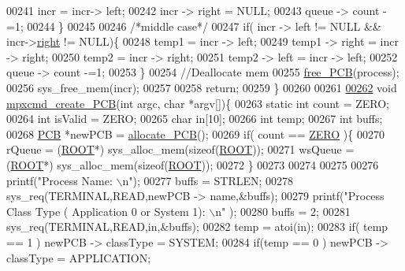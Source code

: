 \begin{DoxyCode}
00241                 incr = incr-> left;
00242                 incr -> right  = NULL;
00243                 queue -> count -=1;
00244         \}
00245         
00246         \textcolor{comment}{/*middle case*/}
00247         \textcolor{keywordflow}{if}( incr -> left != NULL && incr->\hyperlink{structpage_a59bb1b5eca2d579befcc93a2833f4dfd}{right} != NULL)\{
00248                 temp1 = incr -> left;
00249                 temp1 -> right = incr -> right;
00250                 temp2 = incr -> right;
00251                 temp2 -> left = incr -> left;
00252                 queue -> count -=1;
00253         \}
00254         \textcolor{comment}{//Deallocate mem}
00255         \hyperlink{mpx__r2_8c_a79890f055b1d0fccf1962bbde4877caa}{free_PCB}(process);
00256         sys\_free\_mem(incr);
00257         
00258         \textcolor{keywordflow}{return};
00259         \}
00260 
00261 
\hypertarget{mpx__r2_8c_source_l00262}{}\hyperlink{mpx__r2_8h_a782285c58822e411fb75be1e65fe1104}{00262} \textcolor{keywordtype}{void} \hyperlink{mpx__r2_8c_a782285c58822e411fb75be1e65fe1104}{mpxcmd_create_PCB}(\textcolor{keywordtype}{int} argc, \textcolor{keywordtype}{char} *argv[])\{
00263         \textcolor{keyword}{static} \textcolor{keywordtype}{int} count = ZERO;
00264         \textcolor{keywordtype}{int} isValid = ZERO;
00265         \textcolor{keywordtype}{char} in[10];
00266         \textcolor{keywordtype}{int} temp;
00267         \textcolor{keywordtype}{int} buffs;
00268         \hyperlink{structprocess}{PCB} *newPCB = \hyperlink{mpx__r2_8c_a58a8a1ea0a96b9ecf0be29179a5a0a1e}{allocate_PCB}();   
00269         \textcolor{keywordflow}{if}( count == \hyperlink{mpx__r2_8h_ac328e551bde3d39b6d7b8cc9e048d941}{ZERO} )\{
00270                 rQueue = (\hyperlink{structroot}{ROOT}*) sys\_alloc\_mem(\textcolor{keyword}{sizeof}(\hyperlink{structroot}{ROOT}));
00271                 wsQueue = (\hyperlink{structroot}{ROOT}*) sys\_alloc\_mem(\textcolor{keyword}{sizeof}(\hyperlink{structroot}{ROOT}));
00272         \}
00273         
00274         
00275         
00276         printf(\textcolor{stringliteral}{"Process Name: \(\backslash\)n"});
00277         buffs = STRLEN;
00278         sys\_req(TERMINAL,READ,newPCB -> name,&buffs);
00279         printf(\textcolor{stringliteral}{"Process Class Type ( Application 0 or System  1): \(\backslash\)n"} );
00280         buffs = 2;
00281         sys\_req(TERMINAL,READ,in,&buffs);
00282         temp = atoi(in);
00283         \textcolor{keywordflow}{if}( temp == 1 ) newPCB -> classType = SYSTEM;
00284         \textcolor{keywordflow}{if}(temp == 0 ) newPCB -> classType = APPLICATION;

\end{DoxyCode}
